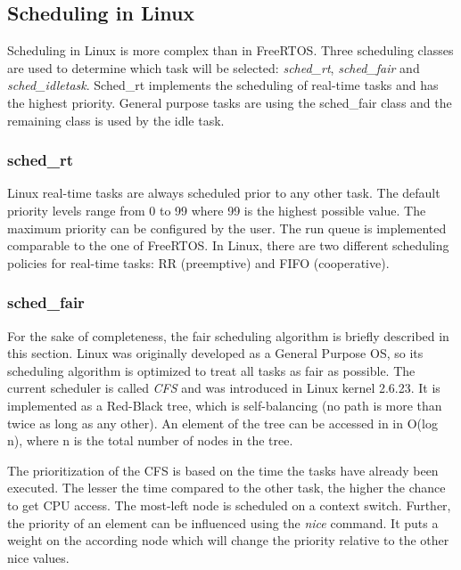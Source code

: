 \subsection{Scheduling in Linux}\label{ss_scheduling_in_linux} 
Scheduling in Linux \cite{love:lkd} \cite{jones:itlcfss} is more complex than in FreeRTOS.
Three scheduling classes are used to determine which task will be selected: \textit{sched\_rt}, \textit{sched\_fair} and \textit{sched\_idletask}.
Sched\_rt implements the scheduling of real-time tasks and has the highest priority. 
General purpose tasks are using the sched\_fair class and the remaining class is used by the idle task.

\subsubsection{sched\_rt} 
Linux real-time tasks are always scheduled prior to any other task. 
The default priority levels range from 0 to 99 where 99 is the highest possible value.
The maximum priority can be configured by the user. 
The run queue is implemented comparable to the one of FreeRTOS. 
In Linux, there are two different scheduling policies for real-time tasks: \ac{RR} (preemptive) and \ac{FIFO} (cooperative).

\subsubsection{sched\_fair}
For the sake of completeness, the fair scheduling algorithm is briefly described in this section.
Linux was originally developed as a General Purpose \ac{OS}, so its scheduling algorithm is optimized to treat all tasks as fair as possible. 
The current scheduler is called \textit{\ac{CFS}} and was introduced in Linux kernel 2.6.23.
It is implemented as a Red-Black tree, which is self-balancing (no path is more than twice as long as any other).
An element of the tree can be accessed in in O(log n), where n is the total number of nodes in the tree.
\par
The prioritization of the \ac{CFS} is based on the time the tasks have already been executed. 
The lesser the time compared to the other task, the higher the chance to get \ac{CPU} access.
The most-left node is scheduled on a context switch.
Further, the priority of an element can be influenced using the \textit{nice} command. 
It puts a weight on the according node which will change the priority relative to the other nice values.

